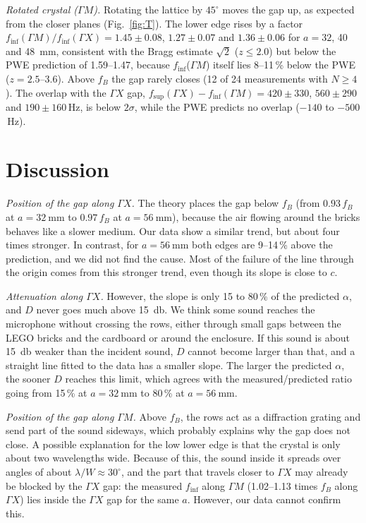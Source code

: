 \documentclass[9pt,a4paper,twocolumn]{extarticle}
\newcommand{\umm}{\milli\metre}
\newcommand{\udB}{\decibel}
\newcommand{\GX}{\ensuremath{\Gamma X}}
\newcommand{\GM}{\ensuremath{\Gamma M}}
\newcommand{\finf}{\ensuremath{f_{\mathrm{inf}}}}
\newcommand{\fsup}{\ensuremath{f_{\mathrm{sup}}}}
\begin{document}
\emph{Rotated crystal (\GM).} Rotating the lattice by $45^\circ$ moves the gap up, as expected from the
closer planes (Fig.~\ref{fig:T}). The lower edge rises by a factor
$\finf(\GM)/\finf(\GX)=1.45\pm0.08$, $1.27\pm0.07$ and $1.36\pm0.06$ for $a=32$, 40 and \SI{48}{\umm}, consistent with
the Bragg estimate $\sqrt2$ ($z\le2.0$) but below the PWE prediction of 1.59--1.47, because \finf(\GM) itself
lies 8--11\,\% below the PWE ($z=2.5$--3.6). Above $f_B$ the gap rarely closes (12 of 24 measurements with
$N\ge4$). The overlap with the \GX{} gap,
$\fsup(\GX)-\finf(\GM)=420\pm330$, $560\pm290$ and $190\pm160$\,Hz, is below $2\sigma$, while the PWE
predicts no overlap ($-140$ to $-500$\,Hz).


\section{Discussion}
\emph{Position of the gap along \GX.} The theory places the gap below $f_B$ (from $0.93\,f_B$ at $a=\SI{32}{\umm}$ to $0.97\,f_B$ at $a=\SI{56}{\umm}$), because the air flowing around the bricks behaves like a slower medium. Our data show a similar trend, but about four times stronger. In contrast, for $a=\SI{56}{\umm}$ both edges are 9--14\,\% above the prediction, and we did not find the cause. Most of the failure of the line through the origin comes from this stronger trend, even though its slope is close to $c$.

\emph{Attenuation along \GX.} However, the slope is only 15 to 80\,\% of the predicted $\alpha$, and $D$ never goes much above \SI{15}{\udB}. We think some sound reaches the microphone without crossing the rows, either through small gaps between the LEGO bricks and the cardboard or around the enclosure. If this sound is about \SI{15}{\udB} weaker than the incident sound, $D$ cannot become larger than that, and a straight line fitted to the data has a smaller slope. The larger the predicted $\alpha$, the sooner $D$ reaches this limit, which agrees with the measured/predicted ratio going from 15\,\% at $a=\SI{32}{\umm}$ to 80\,\% at $a=\SI{56}{\umm}$.

\emph{Position of the gap along \GM.} Above $f_B$, the rows act as a diffraction grating and send part of the sound sideways, which probably explains why the gap does not close. A possible explanation for the low lower edge is that the crystal is only about two wavelengths wide. Because of this, the sound inside it spreads over angles of about $\lambda/W\approx30^\circ$, and the part that travels closer to \GX{} may already be blocked by the \GX{} gap: the measured \finf{} along \GM{} (1.02--1.13 times $f_B$ along \GX) lies inside the \GX{} gap for the same $a$. However, our data cannot confirm this.
\end{document}
